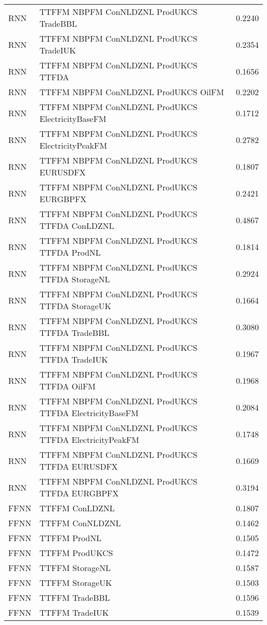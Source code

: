 \begin{table}[h!]
\begin{adjustbox}{max width=\textwidth}
\begin{tabular}{llr}
  RNN & TTFFM NBPFM ConNLDZNL ProdUKCS TradeBBL & 0.2240 \\ 
  RNN & TTFFM NBPFM ConNLDZNL ProdUKCS TradeIUK & 0.2354 \\ 
  RNN & TTFFM NBPFM ConNLDZNL ProdUKCS TTFDA & 0.1656 \\ 
  RNN & TTFFM NBPFM ConNLDZNL ProdUKCS OilFM & 0.2202 \\ 
  RNN & TTFFM NBPFM ConNLDZNL ProdUKCS ElectricityBaseFM & 0.1712 \\ 
  RNN & TTFFM NBPFM ConNLDZNL ProdUKCS ElectricityPeakFM & 0.2782 \\ 
  RNN & TTFFM NBPFM ConNLDZNL ProdUKCS EURUSDFX & 0.1807 \\ 
  RNN & TTFFM NBPFM ConNLDZNL ProdUKCS EURGBPFX & 0.2421 \\ 
  RNN & TTFFM NBPFM ConNLDZNL ProdUKCS TTFDA ConLDZNL & 0.4867 \\ 
  RNN & TTFFM NBPFM ConNLDZNL ProdUKCS TTFDA ProdNL & 0.1814 \\ 
  RNN & TTFFM NBPFM ConNLDZNL ProdUKCS TTFDA StorageNL & 0.2924 \\ 
  RNN & TTFFM NBPFM ConNLDZNL ProdUKCS TTFDA StorageUK & 0.1664 \\ 
  RNN & TTFFM NBPFM ConNLDZNL ProdUKCS TTFDA TradeBBL & 0.3080 \\ 
  RNN & TTFFM NBPFM ConNLDZNL ProdUKCS TTFDA TradeIUK & 0.1967 \\ 
  RNN & TTFFM NBPFM ConNLDZNL ProdUKCS TTFDA OilFM & 0.1968 \\ 
  RNN & TTFFM NBPFM ConNLDZNL ProdUKCS TTFDA ElectricityBaseFM & 0.2084 \\ 
  RNN & TTFFM NBPFM ConNLDZNL ProdUKCS TTFDA ElectricityPeakFM & 0.1748 \\ 
  RNN & TTFFM NBPFM ConNLDZNL ProdUKCS TTFDA EURUSDFX & 0.1669 \\ 
  RNN & TTFFM NBPFM ConNLDZNL ProdUKCS TTFDA EURGBPFX & 0.3194 \\ 
  FFNN & TTFFM ConLDZNL & 0.1807 \\ 
  FFNN & TTFFM ConNLDZNL & 0.1462 \\ 
  FFNN & TTFFM ProdNL & 0.1505 \\ 
  FFNN & TTFFM ProdUKCS & 0.1472 \\ 
  FFNN & TTFFM StorageNL & 0.1587 \\ 
  FFNN & TTFFM StorageUK & 0.1503 \\ 
  FFNN & TTFFM TradeBBL & 0.1596 \\ 
  FFNN & TTFFM TradeIUK & 0.1539 \\ 

\end{tabular}
\end{adjustbox}
\end{table}
